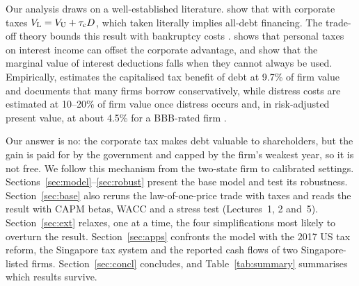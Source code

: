 Our analysis draws on a well-established literature. \citet{mm1963} show that with corporate taxes $V_{\mathrm{L}} = V_{\mathrm{U}} + \tau_{\mathrm{c}} D$, which taken literally implies all-debt financing. The trade-off theory bounds this result with bankruptcy costs \citep{kraus1973}. \citet{miller1977} shows that personal taxes on interest income can offset the corporate advantage, and \citet{deangelo1980} show that the marginal value of interest deductions falls when they cannot always be used. Empirically, \citet{graham2000} estimates the capitalised tax benefit of debt at 9.7\% of firm value and documents that many firms borrow conservatively, while distress costs are estimated at 10--20\% of firm value once distress occurs \citep{andrade1998} and, in risk-adjusted present value, at about 4.5\% for a BBB-rated firm \citep{almeida2007}.

Our answer is no: the corporate tax makes debt valuable to shareholders, but the gain is paid for by the government and capped by the firm's weakest year, so it is not free. We follow this mechanism from the two-state firm to calibrated settings. Sections~\ref{sec:model}--\ref{sec:robust} present the base model and test its robustness. Section~\ref{sec:base} also reruns the law-of-one-price trade with taxes and reads the result with CAPM betas, WACC and a stress test (Lectures~1, 2 and~5). Section~\ref{sec:ext} relaxes, one at a time, the four simplifications most likely to overturn the result. Section~\ref{sec:apps} confronts the model with the 2017 US tax reform, the Singapore tax system and the reported cash flows of two Singapore-listed firms. Section~\ref{sec:concl} concludes, and Table~\ref{tab:summary} summarises which results survive.
